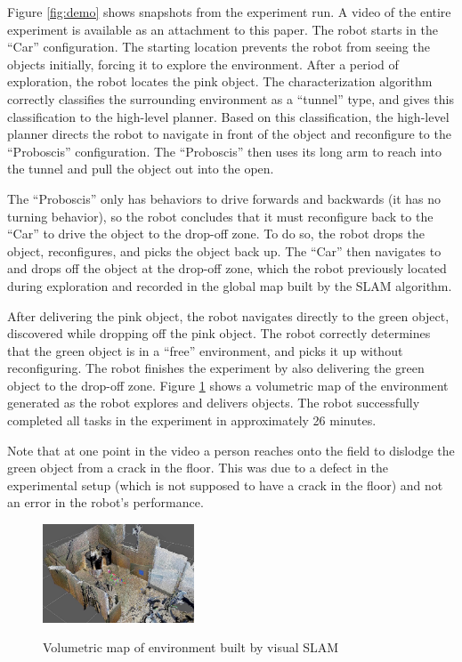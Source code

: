 \documentclass[journal]{IEEEtran}
\begin{document}
%
Figure \ref{fig:demo} shows snapshots from the experiment run. A video of the entire experiment is available as an attachment to this paper. The robot starts in the ``Car'' configuration. The starting location prevents the robot from seeing the objects initially, forcing it to explore the environment. After a period of exploration, the robot locates the pink object. The characterization algorithm correctly classifies the surrounding environment as a ``tunnel'' type, and gives this classification to the high-level planner. Based on this classification, the high-level planner directs the robot to navigate in front of the object and reconfigure to the ``Proboscis'' configuration. The ``Proboscis'' then uses its long arm to reach into the tunnel and pull the object out into the open.

 The ``Proboscis'' only has behaviors to drive forwards and backwards (it has no turning behavior), so the robot concludes that it must reconfigure back to the ``Car'' to drive the object to the drop-off zone.  To do so, the robot drops the object, reconfigures, and picks the object back up. The ``Car'' then navigates to and drops off the object at the drop-off zone, which the robot previously located during exploration and recorded in the global map built by the SLAM algorithm.

After delivering the pink object, the robot navigates directly to the green object, discovered while dropping off the pink object. The robot correctly determines that the green object is in a ``free'' environment, and picks it up without reconfiguring. The robot finishes the experiment by also delivering the green object to the drop-off zone. Figure \ref{fig:octomap} shows a volumetric map of the environment generated as the robot explores and delivers objects. The robot successfully completed all tasks in the experiment in approximately 26 minutes.

Note that at one point in the video a person reaches onto the field to dislodge the green object from a crack in the floor.  This was due to a defect in the experimental setup (which is not supposed to have a crack in the floor) and not an error in the robot's performance.
%
\begin{figure}
\begin{center}
\includegraphics[width=0.4\textwidth]{images/map4.jpg}
\caption{Volumetric map of environment built by visual SLAM}
\vspace{-2em}
\label{fig:octomap}
\end{center}
\end{figure}
\end{document}
